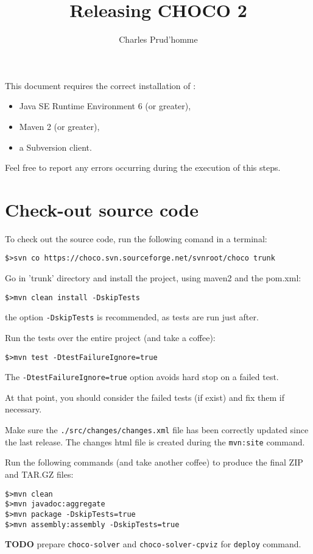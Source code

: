 \documentclass[11pt]{amsart}
\title{Releasing CHOCO 2}
\author{Charles Prud'homme}
\newcommand{\mylst}[1]{\lstinline|#1|}
\begin{document}
\maketitle

This document requires the correct installation of :
\begin{itemize}
\item Java SE Runtime Environment 6 (or greater),
\item Maven 2 (or greater),
\item a Subversion client.
\end{itemize}

Feel free to report any errors occurring during the execution of this steps.

\section{Check-out source code}

To check out the source code, run the following comand in a terminal:
\begin{lstlisting}
$>svn co https://choco.svn.sourceforge.net/svnroot/choco trunk
\end{lstlisting}

\vspace{.5cm}
Go in 'trunk' directory and install the project, using maven2 and the pom.xml:
\begin{lstlisting}
$>mvn clean install -DskipTests
\end{lstlisting}
the option \mylst{-DskipTests} is recommended, as tests are run just after. 

\vspace{.5cm}
Run the tests over the entire project (and take a coffee):
\begin{lstlisting}
$>mvn test -DtestFailureIgnore=true
\end{lstlisting}
The \mylst{-DtestFailureIgnore=true} option avoids hard stop on a failed test. 

At that point, you should consider the failed tests (if exist) and fix them if necessary. 

\vspace{.5cm}
Make sure the \mylst{./src/changes/changes.xml} file has been correctly updated since the last release. The changes html file is created during the \mylst{mvn:site} command. 

\vspace{.5cm}
Run the following commands (and take another coffee) to produce the final ZIP and TAR.GZ files:
\begin{lstlisting}
$>mvn clean
$>mvn javadoc:aggregate
$>mvn package -DskipTests=true
$>mvn assembly:assembly -DskipTests=true
\end{lstlisting}

\textbf{TODO} prepare \mylst{choco-solver} and \mylst{choco-solver-cpviz} for \mylst{deploy} command.
\end{document}
